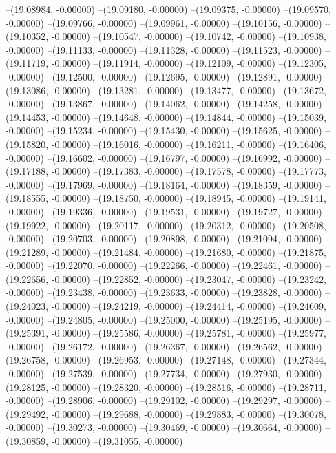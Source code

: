 --(19.08984, -0.00000)
--(19.09180, -0.00000)
--(19.09375, -0.00000)
--(19.09570, -0.00000)
--(19.09766, -0.00000)
--(19.09961, -0.00000)
--(19.10156, -0.00000)
--(19.10352, -0.00000)
--(19.10547, -0.00000)
--(19.10742, -0.00000)
--(19.10938, -0.00000)
--(19.11133, -0.00000)
--(19.11328, -0.00000)
--(19.11523, -0.00000)
--(19.11719, -0.00000)
--(19.11914, -0.00000)
--(19.12109, -0.00000)
--(19.12305, -0.00000)
--(19.12500, -0.00000)
--(19.12695, -0.00000)
--(19.12891, -0.00000)
--(19.13086, -0.00000)
--(19.13281, -0.00000)
--(19.13477, -0.00000)
--(19.13672, -0.00000)
--(19.13867, -0.00000)
--(19.14062, -0.00000)
--(19.14258, -0.00000)
--(19.14453, -0.00000)
--(19.14648, -0.00000)
--(19.14844, -0.00000)
--(19.15039, -0.00000)
--(19.15234, -0.00000)
--(19.15430, -0.00000)
--(19.15625, -0.00000)
--(19.15820, -0.00000)
--(19.16016, -0.00000)
--(19.16211, -0.00000)
--(19.16406, -0.00000)
--(19.16602, -0.00000)
--(19.16797, -0.00000)
--(19.16992, -0.00000)
--(19.17188, -0.00000)
--(19.17383, -0.00000)
--(19.17578, -0.00000)
--(19.17773, -0.00000)
--(19.17969, -0.00000)
--(19.18164, -0.00000)
--(19.18359, -0.00000)
--(19.18555, -0.00000)
--(19.18750, -0.00000)
--(19.18945, -0.00000)
--(19.19141, -0.00000)
--(19.19336, -0.00000)
--(19.19531, -0.00000)
--(19.19727, -0.00000)
--(19.19922, -0.00000)
--(19.20117, -0.00000)
--(19.20312, -0.00000)
--(19.20508, -0.00000)
--(19.20703, -0.00000)
--(19.20898, -0.00000)
--(19.21094, -0.00000)
--(19.21289, -0.00000)
--(19.21484, -0.00000)
--(19.21680, -0.00000)
--(19.21875, -0.00000)
--(19.22070, -0.00000)
--(19.22266, -0.00000)
--(19.22461, -0.00000)
--(19.22656, -0.00000)
--(19.22852, -0.00000)
--(19.23047, -0.00000)
--(19.23242, -0.00000)
--(19.23438, -0.00000)
--(19.23633, -0.00000)
--(19.23828, -0.00000)
--(19.24023, -0.00000)
--(19.24219, -0.00000)
--(19.24414, -0.00000)
--(19.24609, -0.00000)
--(19.24805, -0.00000)
--(19.25000, -0.00000)
--(19.25195, -0.00000)
--(19.25391, -0.00000)
--(19.25586, -0.00000)
--(19.25781, -0.00000)
--(19.25977, -0.00000)
--(19.26172, -0.00000)
--(19.26367, -0.00000)
--(19.26562, -0.00000)
--(19.26758, -0.00000)
--(19.26953, -0.00000)
--(19.27148, -0.00000)
--(19.27344, -0.00000)
--(19.27539, -0.00000)
--(19.27734, -0.00000)
--(19.27930, -0.00000)
--(19.28125, -0.00000)
--(19.28320, -0.00000)
--(19.28516, -0.00000)
--(19.28711, -0.00000)
--(19.28906, -0.00000)
--(19.29102, -0.00000)
--(19.29297, -0.00000)
--(19.29492, -0.00000)
--(19.29688, -0.00000)
--(19.29883, -0.00000)
--(19.30078, -0.00000)
--(19.30273, -0.00000)
--(19.30469, -0.00000)
--(19.30664, -0.00000)
--(19.30859, -0.00000)
--(19.31055, -0.00000)
